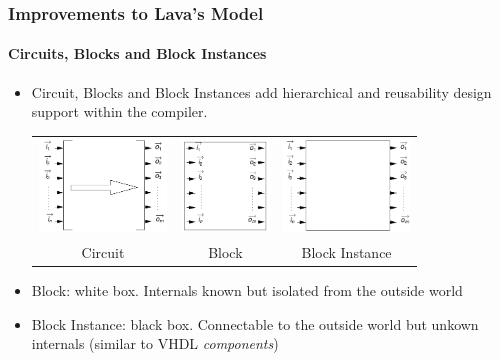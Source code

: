 \documentclass{beamer}
\begin{document}
\begin{frame}
  \frametitle{Improvements to Lava's Model}
  \framesubtitle{Circuits, Blocks and Block Instances}
  \begin{itemize}
    
  \item Circuit, Blocks and Block Instances add hierarchical and
    reusability design support within the compiler.
    
    \hspace{-.5cm}
    \begin{tabular}{c|c|c}
    \includegraphics[height=2.5cm]{figures/Circuit.png}
    &
    \includegraphics[height=2.5cm]{figures/Block.png}
    &
    \includegraphics[height=2.5cm]{figures/Instance.png}
     \\
     Circuit & Block & Block Instance \\
     \end{tabular}
     
   \item Block: white box. Internals known but isolated from the
     outside world
   \item Block Instance: black box. Connectable to the outside world
     but unkown internals (similar to VHDL \textit{components})
  \end{itemize}  
\end{frame}
\end{document}

